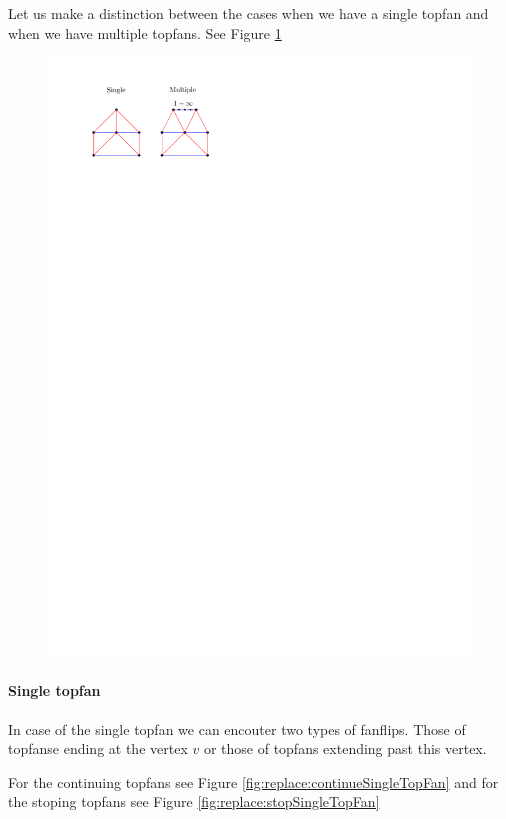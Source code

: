 Let us make a distinction between the cases when we have a single topfan and when we have multiple topfans. See Figure \ref{fig:replace:singleMultiTopFan}

\begin{figure}[h]
  \centering
  \includegraphics[scale=1]{chordReplace/img/singleMultiTopFan}
  \caption{}
  \label{fig:replace:singleMultiTopFan}
\end{figure}

\paragraph{Single topfan}
In case of the single topfan we can encouter two types of fanflips. Those of topfanse ending at the vertex $v$ or those of topfans extending past this vertex.

For the continuing topfans see Figure \ref{fig:replace:continueSingleTopFan} and for the stoping topfans see Figure \ref{fig:replace:stopSingleTopFan}


